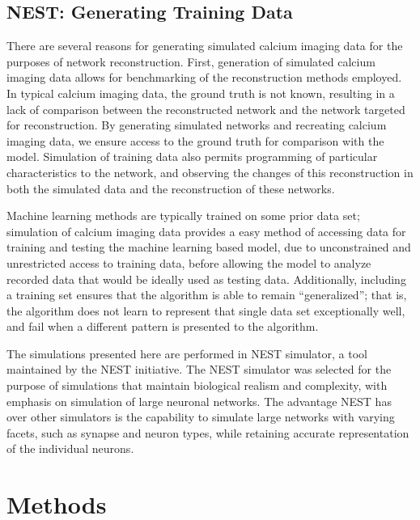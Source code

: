 \documentclass{article}
\begin{document}
\subsection{NEST: Generating Training Data}
There are several reasons for generating simulated calcium imaging data for the purposes of network reconstruction. First, generation of simulated calcium imaging data allows for benchmarking of the reconstruction methods employed. In typical calcium imaging data, the ground truth is not known, resulting in a lack of comparison between the reconstructed network and the network targeted for reconstruction. By generating simulated networks and recreating calcium imaging data, we ensure access to the ground truth for comparison with the model. Simulation of training data also permits programming of particular characteristics to the network, and observing the changes of this reconstruction in both the simulated data and the reconstruction of these networks.\par
Machine learning methods are typically trained on some prior data set; simulation of calcium imaging data provides a easy method of accessing data for training and testing the machine learning based model, due to unconstrained and unrestricted access to training data, before allowing the model to analyze recorded data that would be ideally used as testing data. Additionally, including a training set ensures that the algorithm is able to remain “generalized”; that is, the algorithm does not learn to represent that single data set exceptionally well, and fail when a different pattern is presented to the algorithm.\par
The simulations presented here are performed in NEST simulator, a tool maintained by the NEST initiative. The NEST simulator was selected for the purpose of simulations that maintain biological realism and complexity, with emphasis on simulation of large neuronal networks. The advantage NEST has over other simulators is the capability to simulate large networks with varying facets, such as synapse and neuron types, while retaining accurate representation of the individual neurons.\par

\section{Methods}
\end{document}
